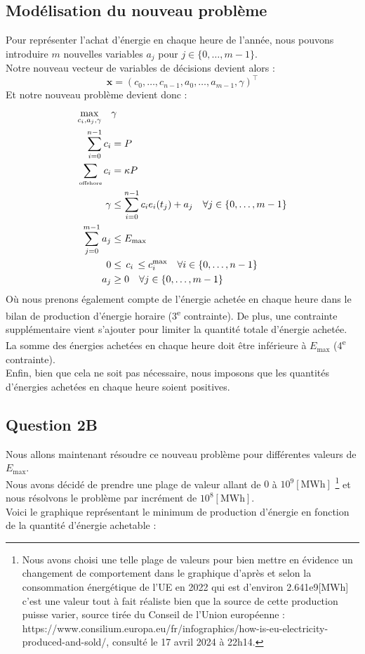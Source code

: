 \documentclass{article}
\begin{document}
\subsection*{Modélisation du nouveau problème}
Pour représenter l'achat d'énergie en chaque heure de l'année, nous pouvons introduire $m$ nouvelles variables $a_j$ pour $j \in \{ 0, \ldots, m-1 \}$.\\
Notre nouveau vecteur de variables de décisions devient alors : 
\[ \bm{x} = (c_0, \ldots, c_{n-1}, a_0, \ldots, a_{m-1}, \gamma )^\intercal \]
Et notre nouveau problème devient donc :
\begin{align*}
    \max_{c_i, a_j, \gamma} \quad  &\gamma \\ 
    \sum_{i=0}^{n-1} c_i &= P\\
    \sum_{\text{\tiny offshore}}c_i &= \kappa P\\
    \gamma &\le \sum_{i=0}^{n-1} c_i e_i(t_j) + a_j \quad \forall j \in \{0, \ldots, m-1\}\\
    \sum _{j=0}^{m-1} a_j &\le E_{\text{max}}\\
    0 &\le \, c_i \, \le c_i^{\max} \quad \forall i \in \{0, \ldots, n-1\}\\
    a_j &\ge 0 \quad \forall j \in \{0, \ldots, m-1\}
\end{align*}
Où nous prenons également compte de l'énergie achetée en chaque heure dans le bilan de production d'énergie horaire (3\textsuperscript{e} contrainte).
De plus, une contrainte supplémentaire vient s'ajouter pour limiter la quantité totale d'énergie achetée. La somme des énergies achetées en chaque heure doit être inférieure à $E_{\text{max}}$ (4\textsuperscript{e} contrainte).\\
Enfin, bien que cela ne soit pas nécessaire, nous imposons que les quantités d'énergies achetées en chaque heure soient positives.

\newpage
\subsection*{Question 2B}
Nous allons maintenant résoudre ce nouveau problème pour différentes valeurs de $E_{\text{max}}$.\\
Nous avons décidé de prendre une plage de valeur allant de $0$ à $10^{9} [\mathrm{MWh}]$
\footnote{Nous avons choisi une telle plage de valeurs pour bien mettre en évidence un changement de comportement dans le graphique d'après et selon la consommation énergétique de l'UE en 2022 qui est d'environ 2.641e9[MWh] c'est une valeur tout à fait réaliste bien que la source de cette production puisse varier, source tirée du  Conseil de l'Union européenne : https://www.consilium.europa.eu/fr/infographics/how-is-eu-electricity-produced-and-sold/, consulté le 17 avril 2024 à 22h14.}
et nous résolvons le problème par incrément de $10^8 [\mathrm{MWh}]$.\\
Voici le graphique représentant le minimum de production d'énergie en fonction de la quantité d'énergie achetable :
\end{document}
